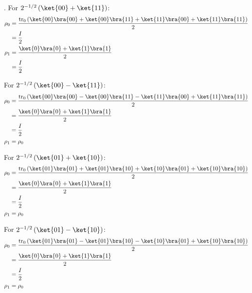 \begingroup
\newcommand{\trA}[1]{\mathrm{tr}_0 \left( #1 \right)}
\newcommand{\kb}[2]{\ket{#1} \bra{#2}}
%
\par {}.
%
For $2^{-1/2} \left( \ket{00} + \ket{11} \right)$:
%
\begin{align}
\rho_0 &= \frac{\trA{\kb{00}{00} + \kb{00}{11} + \kb{11}{00} + \kb{11}{11}}}{2} \\
&= \frac{I}{2} \\
\rho_1 &= \frac{\kb{0}{0} + \kb{1}{1}}{2} \\
&= \frac{I}{2}
\end{align}
%
\par For $2^{-1/2} \left( \ket{00} - \ket{11} \right)$:
%
\begin{align}
\rho_0 &= \frac{\trA{\kb{00}{00} - \kb{00}{11} - \kb{11}{00} + \kb{11}{11}}}{2} \\
&= \frac{\kb{0}{0} + \kb{1}{1}}{2} \\
&= \frac{I}{2} \\
\rho_1 &= \rho_0

\end{align}
%
\par For $2^{-1/2} \left( \ket{01} + \ket{10} \right)$:
%
\begin{align}
\rho_0 &= \frac{\trA{\kb{01}{01} + \kb{01}{10} + \kb{10}{01} + \kb{10}{10}}}{2} \\
&= \frac{\kb{0}{0} + \kb{1}{1}}{2} \\
&= \frac{I}{2} \\
\rho_1 &= \rho_0
\end{align}
%
\par For $2^{-1/2} \left( \ket{01} - \ket{10} \right)$:
%
\begin{align}
\rho_0 &= \frac{\trA{\kb{01}{01} - \kb{01}{10} - \kb{10}{01} + \kb{10}{10}}}{2} \\
&= \frac{\kb{0}{0} + \kb{1}{1}}{2} \\
&= \frac{I}{2} \\
\rho_1 &= \rho_0
\end{align}
\endgroup
